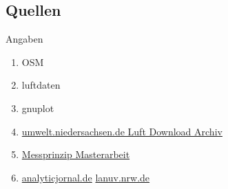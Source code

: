 \documentclass[aspectratio=169]{beamer} %
\begin{document}
\subsection{Quellen}
\begin{frame}{Angaben}
  \begin{enumerate}
  \item OSM
  \item luftdaten
  \item gnuplot
  \item \href{https://www.umwelt.niedersachsen.de/themen/luft/luen/aktuelle_messwerte/archiv/download/}{umwelt.niedersachsen.de Luft Download Archiv}
  \item \href{www.bund-neckar-alb.de/fileadmin/rv_neckar-alb/MasterarbeitBlonFeinstaubmessungimVergleich2017.pdf}{Messprinzip Masterarbeit}
  \item \href{www.analyticjournal.de/fachreports/grimm_nano_tubln_07_09/grimm_nano_pesch.pdf}{analyticjornal.de}
  \iten \href{https://www.lanuv.nrw.de/fileadmin/lanuv/gesundheit/schadstoffe/gesundheitliche_wirkungen.pdf}{lanuv.nrw.de}
  \end{enumerate}
\end{frame}
\end{document}
